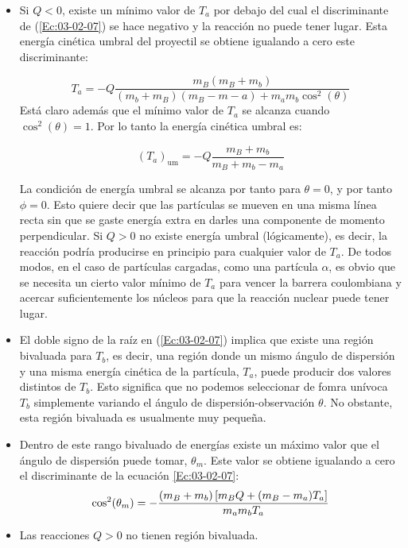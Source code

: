 \begin{itemize}
	\item Si $Q<0$, existe un mínimo valor de $T_a$ por debajo del cual el discriminante de (\ref{Ec:03-02-07}) se hace negativo y la reacción no puede tener lugar. Esta energía cinética umbral del proyectil se obtiene igualando a cero este discriminante:
	
	\begin{equation}
		T_a = -Q\frac{m_B(m_B+m_b)}{(m_b+m_B)(m_B-m-a)+m_am_b\cos^2 (\theta)}
	\end{equation}
	Está claro además que el mínimo valor de $T_a$ se alcanza cuando $\cos^2 (\theta)  =1$. Por lo tanto la energía cinética umbral es:
	
	\begin{mybox}
	\begin{equation}
		(T_a)_{\text{um}} = - Q \frac{m_B + m_b}{m_B + m_b - m_a}
	\end{equation}
\end{mybox}
	La condición de energía umbral se alcanza por tanto para $\theta = 0$, y por tanto $\phi=0$. Esto quiere decir que las partículas se mueven en una misma línea recta sin que se gaste energía extra en darles una componente de momento perpendicular. Si $Q>0$ no existe energía umbral (lógicamente), es decir, la reacción podría producirse en principio para cualquier valor de $T_a$. De todos modos, en el caso de partículas cargadas, como una partícula $\alpha$, es obvio que se necesita un cierto valor mínimo de $T_a$ para vencer la barrera coulombiana y acercar suficientemente los núcleos para que la reacción nuclear puede tener lugar.
	\item El doble signo de la raíz en (\ref{Ec:03-02-07}) implica que existe una región bivaluada para $T_b$, es decir, una región donde un mismo ángulo de dispersión y una misma energía cinética de la partícula, $T_a$, puede producir dos valores distintos de $T_b$. Esto significa que no podemos seleccionar de fomra unívoca $T_b$ simplemente variando el ángulo de dispersión-observación $\theta$. No obstante, esta región bivaluada es usualmente muy pequeña.
	\item Dentro de este rango bivaluado de energías existe un máximo valor que el ángulo de dispersión puede tomar, $\theta_m$. Este valor se obtiene igualando a cero el discriminante de la ecuación \ref{Ec:03-02-07}:
	\begin{equation}
		\cos^2 (\theta_m) = - \frac{(m_B+m_b)\left[ m_B Q + (m_B-m_a) T_a \right]}{m_a m_b T_a}
	\end{equation}
	\item Las reacciones $Q>0$ no tienen región bivaluada.
\end{itemize}

